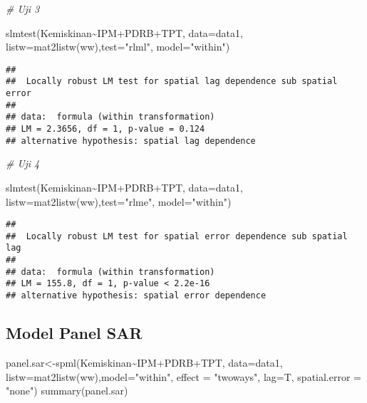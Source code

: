 \documentclass[
]{book}
\newenvironment{Shaded}{\begin{snugshade}}{\end{snugshade}}
\newcommand{\AttributeTok}[1]{\textcolor[rgb]{0.77,0.63,0.00}{#1}}
\newcommand{\CommentTok}[1]{\textcolor[rgb]{0.56,0.35,0.01}{\textit{#1}}}
\newcommand{\FunctionTok}[1]{\textcolor[rgb]{0.00,0.00,0.00}{#1}}
\newcommand{\NormalTok}[1]{#1}
\newcommand{\OtherTok}[1]{\textcolor[rgb]{0.56,0.35,0.01}{#1}}
\newcommand{\SpecialCharTok}[1]{\textcolor[rgb]{0.00,0.00,0.00}{#1}}
\newcommand{\StringTok}[1]{\textcolor[rgb]{0.31,0.60,0.02}{#1}}
\begin{document}
\begin{Shaded}
\begin{Highlighting}[]
\CommentTok{\# Uji 3}

\FunctionTok{slmtest}\NormalTok{(Kemiskinan}\SpecialCharTok{\textasciitilde{}}\NormalTok{IPM}\SpecialCharTok{+}\NormalTok{PDRB}\SpecialCharTok{+}\NormalTok{TPT, }\AttributeTok{data=}\NormalTok{data1, }\AttributeTok{listw=}\FunctionTok{mat2listw}\NormalTok{(ww),}\AttributeTok{test=}\StringTok{"rlml"}\NormalTok{, }\AttributeTok{model=}\StringTok{"within"}\NormalTok{)}
\end{Highlighting}
\end{Shaded}

\begin{verbatim}
## 
##  Locally robust LM test for spatial lag dependence sub spatial error
## 
## data:  formula (within transformation)
## LM = 2.3656, df = 1, p-value = 0.124
## alternative hypothesis: spatial lag dependence
\end{verbatim}

\begin{Shaded}
\begin{Highlighting}[]
\CommentTok{\# Uji 4}

\FunctionTok{slmtest}\NormalTok{(Kemiskinan}\SpecialCharTok{\textasciitilde{}}\NormalTok{IPM}\SpecialCharTok{+}\NormalTok{PDRB}\SpecialCharTok{+}\NormalTok{TPT, }\AttributeTok{data=}\NormalTok{data1, }\AttributeTok{listw=}\FunctionTok{mat2listw}\NormalTok{(ww),}\AttributeTok{test=}\StringTok{"rlme"}\NormalTok{, }\AttributeTok{model=}\StringTok{"within"}\NormalTok{)}
\end{Highlighting}
\end{Shaded}

\begin{verbatim}
## 
##  Locally robust LM test for spatial error dependence sub spatial lag
## 
## data:  formula (within transformation)
## LM = 155.8, df = 1, p-value < 2.2e-16
## alternative hypothesis: spatial error dependence
\end{verbatim}

\hypertarget{model-panel-sar}{%
\subsection{Model Panel SAR}\label{model-panel-sar}}

\begin{Shaded}
\begin{Highlighting}[]
\NormalTok{panel.sar}\OtherTok{\textless{}{-}}\FunctionTok{spml}\NormalTok{(Kemiskinan}\SpecialCharTok{\textasciitilde{}}\NormalTok{IPM}\SpecialCharTok{+}\NormalTok{PDRB}\SpecialCharTok{+}\NormalTok{TPT, }\AttributeTok{data=}\NormalTok{data1, }\AttributeTok{listw=}\FunctionTok{mat2listw}\NormalTok{(ww),}\AttributeTok{model=}\StringTok{"within"}\NormalTok{, }
                \AttributeTok{effect =} \StringTok{"twoways"}\NormalTok{, }\AttributeTok{lag=}\NormalTok{T, }\AttributeTok{spatial.error =} \StringTok{"none"}\NormalTok{)}
\FunctionTok{summary}\NormalTok{(panel.sar)}
\end{Highlighting}
\end{Shaded}
\end{document}
